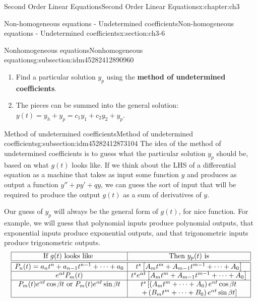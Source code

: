 \documentclass[oneside,10pt,]{book}
\newcommand{\terminology}[1]{\textbf{#1}}
\numberwithin{equation}{section}
\numberwithin{equation}{section}
\newcommand{\amp}{&}
\begin{document}
\begin{chapterptx}{Second Order Linear Equations}{}{Second Order Linear Equations}{}{}{x:chapter:ch3}
\begin{sectionptx}{Non-homogeneous equations - Undetermined coefficients}{}{Non-homogeneous equations - Undetermined coefficients}{}{}{x:section:ch3-6}
\begin{subsectionptx}{Nonhomogeneous equations}{}{Nonhomogeneous equations}{}{}{g:subsection:idm45282412890960}
\begin{enumerate}
\item{}Find a particular solution \(y_{p}\) using the \terminology{method of undetermined coefficients}.%
\item{}The pieces can be summed into the general solution: \(y(t)=y_{h}+y_{p}=c_{1}y_{1}+c_{2}y_{2}+y_{p}\).%
\end{enumerate}
%
\end{subsectionptx}
%
%
\typeout{************************************************}
\typeout{************************************************}
%
\begin{subsectionptx}{Method of undetermined coefficients}{}{Method of undetermined coefficients}{}{}{g:subsection:idm45282412873104}
The idea of the method of undetermined coefficients is to guess what the particular solution \(y_{p}\) should be, based on what \(g(t)\) looks like. If we think about the LHS of a differential equation as a machine that takes as input some function \(y\) and produces as output a function \(y'' + py' + qy\), we can guess the sort of input that will be required to produce the output \(g(t)\) as a sum of derivatives of \(y\).%
\par
Our guess of \(y_{p}\) will always be the general form of \(g(t)\), for nice function. For example, we will guess that polynomial inputs produce polynomial outputs, that exponential inputs produce exponential outputs, and that trigonometric inputs produce trigonometric outputs.%
\begin{equation*}
\begin{array}{|c|c|}
\hline
\text{If } g(t) \text{ looks like }  \amp \text{Then } y_{p}(t) \text{ is}\\
\hline
\hline
P_{n}(t)=a_{n}t^{n}+a_{n-1}t^{n-1}+\cdots+a_{0} \amp t^{s}\left[A_{m}t^{m}+A_{m-1}t^{m-1}+\cdots+A_{0}\right]\\
\hline
e^{\alpha t}P_{m}(t) \amp t^{s}e^{\alpha t}\left[A_{m}t^{m}+A_{m-1}t^{m-1}+\cdots+A_{0}\right]\\
\hline
P_{m}(t)e^{\alpha t}\cos\beta t \text{ or } P_{m}(t)e^{\alpha t}\sin\beta t \amp t^{s}\left[\left(A_{m}t^{m}+\cdots+A_{0}\right)e^{\alpha t}\cos\beta t\right. \\
\amp \left.+\left(B_{m}t^{m}+\cdots+B_{0}\right)e^{\alpha t}\sin\beta t\right]\\
\hline
\end{array}
\end{equation*}

\end{subsectionptx}
\end{sectionptx}
\end{chapterptx}
\end{document}
